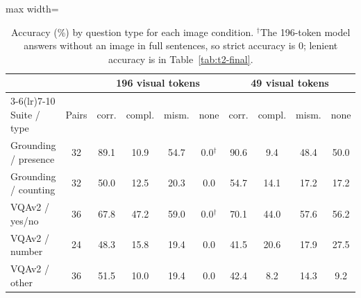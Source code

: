 \begin{table}[htbp]
\centering
\small
\caption{Accuracy (\%) by question type for each image condition. $^\dagger$The 196-token model answers without an image in full sentences, so strict accuracy is 0; lenient accuracy is in Table~\ref{tab:t2-final}.}
\label{tab:t2-bytype}
\begin{adjustbox}{max width=\linewidth}
\begin{tabular}{lccccccccc}
\toprule
 & & \multicolumn{4}{c}{196 visual tokens} & \multicolumn{4}{c}{49 visual tokens} \\
\cmidrule(lr){3-6}\cmidrule(lr){7-10}
Suite / type & Pairs & corr. & compl. & mism. & none & corr. & compl. & mism. & none \\
\midrule
Grounding / presence & 32 & 89.1 & 10.9 & 54.7 & 0.0$^\dagger$ & 90.6 & 9.4 & 48.4 & 50.0 \\
Grounding / counting & 32 & 50.0 & 12.5 & 20.3 & 0.0 & 54.7 & 14.1 & 17.2 & 17.2 \\
\midrule
VQAv2 / yes/no & 36 & 67.8 & 47.2 & 59.0 & 0.0$^\dagger$ & 70.1 & 44.0 & 57.6 & 56.2 \\
VQAv2 / number & 24 & 48.3 & 15.8 & 19.4 & 0.0 & 41.5 & 20.6 & 17.9 & 27.5 \\
VQAv2 / other & 36 & 51.5 & 10.0 & 19.4 & 0.0 & 42.4 & 8.2 & 14.3 & 9.2 \\
\bottomrule
\end{tabular}
\end{adjustbox}
\end{table}
